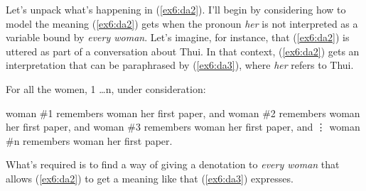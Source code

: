Let's unpack what's happening in (\ref{ex6:da2}). I'll begin by considering how to model the meaning (\ref{ex6:da2}) gets when the pronoun \emph{her} is not interpreted as a variable bound by \emph{every woman}. Let's imagine, for instance, that (\ref{ex6:da2}) is uttered as part of a conversation about Thui. In that context, (\ref{ex6:da2}) gets an interpretation that can be paraphrased by (\ref{ex6:da3}), where \emph{her} refers to Thui.
\begin{exe}
\raggedright
	\ex \label{ex6:da3}
	For all the women, 1 \ldots n, under consideration:
	\begin{xlist}
		\ex woman \#1 remembers woman her first paper, and
		\ex woman \#2 remembers woman her first paper, and
		\ex woman \#3 remembers woman her first paper, and
		\sn \hspace*{1.25in}\vdots
		\ex woman \#n remembers woman her first paper.
	\end{xlist}
\end{exe}
What's required is to find a way of giving a denotation to \emph{every woman} that allows (\ref{ex6:da2}) to get a meaning like that (\ref{ex6:da3}) expresses. 

